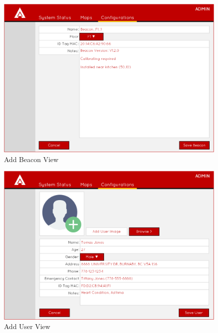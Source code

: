\medskip
\begin{figure}[H]
\centering
    \includegraphics[scale=0.45]{./images/UIMU_add_beacon.png}
    \caption{Add Beacon View}
    \label{add_b}
\end{figure}

\medskip
\begin{figure}[H]
\centering
    \includegraphics[scale=0.45]{./images/UIMU_add_user.png}
    \caption{Add User View}
    \label{add_user}
\end{figure}





